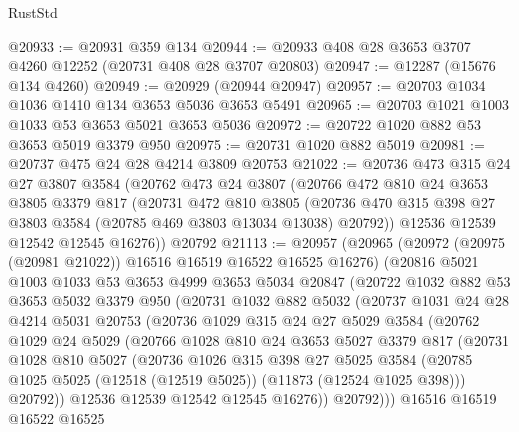 \begin{lexlean}{RustStd}
\begin{coremodule}
@20933 := @20931 @359 @134
@20944 := @20933 @408 @28 @3653 @3707 @4260 @12252 (@20731 @408 @28 @3707 @20803)
@20947 := @12287 (@15676 @134 @4260)
@20949 := @20929 (@20944 @20947)
@20957 := @20703 @1034 @1036 @1410 @134 @3653 @5036 @3653 @5491
@20965 := @20703 @1021 @1003 @1033 @53 @3653 @5021 @3653 @5036
@20972 := @20722 @1020 @882 @53 @3653 @5019 @3379 @950
@20975 := @20731 @1020 @882 @5019
@20981 := @20737 @475 @24 @28 @4214 @3809 @20753
@21022 := @20736
    @473
    @315
    @24
    @27
    @3807
    @3584
    (@20762
      @473
      @24
      @3807
      (@20766
        @472
        @810
        @24
        @3653
        @3805
        @3379
        @817
        (@20731
          @472
          @810
          @3805
          (@20736 @470 @315 @398 @27 @3803 @3584 (@20785 @469 @3803 @13034 @13038) @20792))
        @12536
        @12539
        @12542
        @12545
        @16276))
    @20792
@21113 := @20957
    (@20965
      (@20972 (@20975 (@20981 @21022)) @16516 @16519 @16522 @16525 @16276)
      (@20816
        @5021
        @1003
        @1033
        @53
        @3653
        @4999
        @3653
        @5034
        @20847
        (@20722
          @1032
          @882
          @53
          @3653
          @5032
          @3379
          @950
          (@20731
            @1032
            @882
            @5032
            (@20737
              @1031
              @24
              @28
              @4214
              @5031
              @20753
              (@20736
                @1029
                @315
                @24
                @27
                @5029
                @3584
                (@20762
                  @1029
                  @24
                  @5029
                  (@20766
                    @1028
                    @810
                    @24
                    @3653
                    @5027
                    @3379
                    @817
                    (@20731
                      @1028
                      @810
                      @5027
                      (@20736
                        @1026
                        @315
                        @398
                        @27
                        @5025
                        @3584
                        (@20785 @1025 @5025 (@12518 (@12519 @5025)) (@11873 (@12524 @1025 @398)))
                        @20792))
                    @12536
                    @12539
                    @12542
                    @12545
                    @16276))
                @20792)))
          @16516
          @16519
          @16522
          @16525

\end{coremodule}
\end{lexlean}
